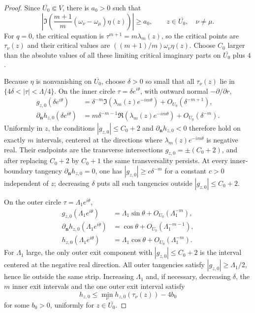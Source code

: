 \documentclass[reqno]{article}
\theoremstyle{definition}
\theoremstyle{remark}
\theoremstyle{plain}
\begin{document}
\begin{proof}
Since $\overline{U_0}\Subset V$, there is $a_0>0$ such that
$$\left|\Im\left(\frac{m+1}{m}(\omega_\nu-\omega_\mu)\eta(z)\right)\right|\ge a_0,
\qquad z\in\overline{U_0},\quad \nu\ne\mu.$$
For $q=0$, the critical equation is $\tau^{m+1}=m\lambda_m(z)$, so the critical points are $\tau_\nu(z)$ and their critical values are $((m+1)/m)\omega_\nu\eta(z)$. Choose $C_0$ larger than the absolute values of all these limiting critical imaginary parts on $\overline{U_0}$ plus $4$.

Because $\eta$ is nonvanishing on $\overline{U_0}$, choose $\delta>0$ so small that all $\tau_\nu(z)$ lie in $\{4\delta<|\tau|<\Lambda/4\}$. On the inner circle $\tau=\delta e^{i\theta}$, with outward normal $-\partial/\partial r$,
\begin{align*}
g_{z,0}(\delta e^{i\theta})
&=\delta^{-m}\Im(\lambda_m(z)e^{-im\theta})+O_{U_0}(\delta^{-m+1}),\\
\partial_{\mathbf n}h_{z,0}(\delta e^{i\theta})
&=m\delta^{-m-1}\Re(\lambda_m(z)e^{-im\theta})+O_{U_0}(\delta^{-m}).
\end{align*}
Uniformly in $z$, the conditions $|g_{z,0}|\le C_0+2$ and $\partial_{\mathbf n}h_{z,0}<0$ therefore hold on exactly $m$ intervals, centered at the directions where $\lambda_m(z)e^{-im\theta}$ is negative real. Their endpoints are the transverse intersections $g_{z,0}=\pm(C_0+2)$, and after replacing $C_0+2$ by $C_0+1$ the same transversality persists. At every inner-boundary tangency $\partial_{\mathbf n}h_{z,0}=0$, one has $|g_{z,0}|\ge c\delta^{-m}$ for a constant $c>0$ independent of $z$; decreasing $\delta$ puts all such tangencies outside $|g_{z,0}|\le C_0+2$.

On the outer circle $\tau=\Lambda_1e^{i\theta}$,
\begin{align*}
g_{z,0}(\Lambda_1 e^{i\theta})&=\Lambda_1\sin\theta+O_{U_0}(\Lambda_1^{-m}),\\
\partial_{\mathbf n}h_{z,0}(\Lambda_1 e^{i\theta})&=\cos\theta+O_{U_0}(\Lambda_1^{-m-1}),\\
h_{z,0}(\Lambda_1 e^{i\theta})&=\Lambda_1\cos\theta+O_{U_0}(\Lambda_1^{-m}).
\end{align*}
For $\Lambda_1$ large, the only outer exit component with $|g_{z,0}|\le C_0+2$ is the interval centered at the negative real direction. All outer tangencies satisfy $|g_{z,0}|\ge \Lambda_1/2$, hence lie outside the same strip. Increasing $\Lambda_1$ and, if necessary, decreasing $\delta$, the $m$ inner exit intervals and the one outer exit interval satisfy
$$h_{z,0}\le \min_\nu h_{z,0}(\tau_\nu(z))-4b_0$$
for some $b_0>0$, uniformly for $z\in\overline{U_0}$.


\end{proof}
\end{document}
